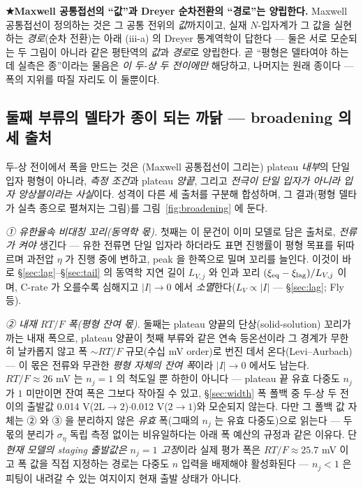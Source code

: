 \textbf{★Maxwell 공통접선의 ``값''과 Dreyer 순차전환의 ``경로''는 양립한다.} Maxwell 공통접선이 정의하는 것은
그 공통 전위의 \emph{값}까지이고, 실재 $N$-입자계가 그 값을 실현하는 \emph{경로}(순차 전환)는 아래 (iii-a) 의
Dreyer 통계역학이 답한다 --- 둘은 서로 모순되는 두 그림이 아니라 같은 평탄역의 \emph{값}과 \emph{경로}로
양립한다. 곧 ``평형은 델타여야 하는데 실측은 종''이라는 물음은 \emph{이 두-상 두 전이에만} 해당하고,
나머지는 원래 종이다 --- 폭의 지위를 따질 자리도 이 둘뿐이다.

\subsection{둘째 부류의 델타가 종이 되는 까닭 --- broadening 의 세 출처}\label{sec:broadening-sources}
두-상 전이에서 폭을 만드는 것은 (Maxwell
공통접선이 그리는) plateau \emph{내부}의 단일 입자 평형이 아니라, \emph{측정 조건}과 plateau \emph{양끝}, 그리고
\emph{전극이 단일 입자가 아니라 입자 앙상블이라는 사실}이다. 성격이 다른 세 출처를 구분해 합성하며, 그 결과(평형 델타가
실측 종으로 펼쳐지는 그림)를 그림~\ref{fig:broadening} 에 둔다.

\emph{① 유한율속 비대칭 꼬리(동역학 몫).} 첫째는 이 문건이 이미 모델로 담은 출처로, \emph{전류가 켜야} 생긴다 --- 유한
전류면 단일 입자라 하더라도 표면 진행률이 평형 목표를 뒤따르며 과전압 $\eta$ 가 진행 중에 변하고, peak 을 한쪽으로
밀며 꼬리를 늘인다. 이것이 바로 \S\ref{sec:lag}--\S\ref{sec:tail} 의 동역학 지연 길이 $L_{V,j}$ 와 인과 꼬리
$(\xi_{\mathrm{eq}}-\xi_\mathrm{lag})/L_{V,j}$ 이며, C-rate 가 오를수록 심해지고 $|I|\!\to\!0$ 에서
\emph{소멸}한다($L_V\propto|I|$ --- \S\ref{sec:lag}; Fly 등\cite{fly2020}).

\emph{② 내재 $RT/F$ 폭(평형 잔여 몫).} 둘째는 plateau 양끝의 단상(solid-solution) 꼬리가 까는 내재 폭으로, plateau
양끝이 첫째 부류와 같은 연속 등온선이라 그 경계가 무한히 날카롭지 않고 폭 $\sim RT/F$ 규모(수십 mV order)로 번진 데서
온다(Levi--Aurbach\cite{leviaurbach1999}) --- 이 몫은 전류와 무관한 \emph{평형 자체의 잔여 폭}이라 $|I|\!\to\!0$ 에서도
남는다. $RT/F\!\approx\!26$ mV 는 $n_j{=}1$ 의 척도일 뿐 하한이 아니다 --- plateau 끝 유효 다중도 $n_j$ 가
$1$ 미만이면 잔여 폭은 그보다 작아질 수 있고, \S\ref{sec:width} 폭 폴백 중 두-상 두 전이의 출발값
0.014 V($2\mathrm L\!\to\!2$)$\cdot$0.012 V($2\!\to\!1$)와 모순되지 않는다. 다만 그 폴백 값 자체는 ② 와
③ 을 분리하지 않은 \emph{유효} 폭(그때의 $n_j$ 는 유효 다중도)으로 읽는다 --- 두 몫의 분리가
$\sigma_\eta$ 독립 측정 없이는 비유일하다는 아래 폭 예산의 규정과 같은 이유다. 단 \emph{현재 모델의 staging
출발값은 $n_j{=}1$ 고정}이라 실제 평가 폭은 $RT/F\!\approx\!25.7$ mV 이고 폭 값을 직접 지정하는 경로는 다중도
$n$ 입력을 배제해야 활성화된다 --- $n_j\!<\!1$ 은 피팅이 내려갈 수 있는 여지이지 현재 출발 상태가 아니다.

